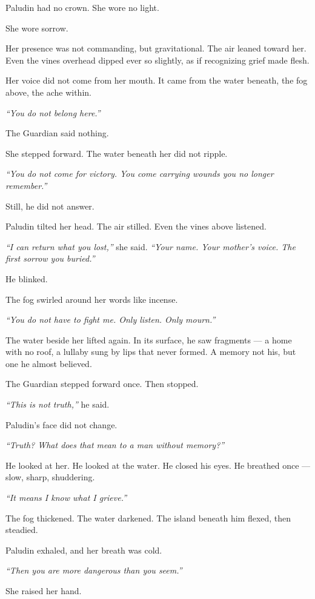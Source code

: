 \documentclass[12pt]{article}
\begin{document}
Paludin had no crown. She wore no light.

She wore sorrow.

Her presence was not commanding, but gravitational. The air leaned toward her. Even the vines overhead dipped ever so slightly, as if recognizing grief made flesh.

Her voice did not come from her mouth. It came from the water beneath, the fog above, the ache within.

\textit{``You do not belong here.''}

The Guardian said nothing.

She stepped forward. The water beneath her did not ripple.

\textit{``You do not come for victory. You come carrying wounds you no longer remember.''}

Still, he did not answer.

Paludin tilted her head. The air stilled. Even the vines above listened.

\textit{``I can return what you lost,''} she said. \textit{``Your name. Your mother’s voice. The first sorrow you buried.''}

He blinked.

The fog swirled around her words like incense.

\textit{``You do not have to fight me. Only listen. Only mourn.''}

The water beside her lifted again. In its surface, he saw fragments — a home with no roof, a lullaby sung by lips that never formed. A memory not his, but one he almost believed.

The Guardian stepped forward once. Then stopped.

\textit{``This is not truth,''} he said.

Paludin’s face did not change.

\textit{``Truth? What does that mean to a man without memory?''}

He looked at her. He looked at the water. He closed his eyes. He breathed once — slow, sharp, shuddering.

\textit{``It means I know what I grieve.''}

The fog thickened. The water darkened. The island beneath him flexed, then steadied.

Paludin exhaled, and her breath was cold.

\textit{``Then you are more dangerous than you seem.''}

She raised her hand.
\end{document}

